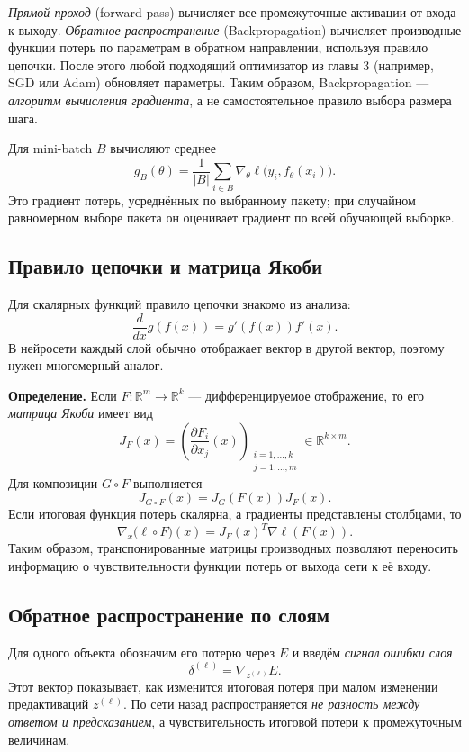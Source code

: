 \documentclass[12pt,a4paper]{article}
\newcommand{\R}{\mathbb{R}}
\begin{document}
\emph{Прямой проход} (forward pass) вычисляет все промежуточные
активации от входа к выходу. \emph{Обратное распространение}
(Backpropagation) вычисляет производные функции потерь
по параметрам в обратном направлении, используя правило цепочки.
После этого любой подходящий оптимизатор из главы 3
(например, SGD или Adam) обновляет параметры.
Таким образом, Backpropagation --- \emph{алгоритм вычисления
градиента}, а не самостоятельное правило выбора размера шага.

Для mini-batch $B$ вычисляют среднее
\[
    g_B(\theta)=\frac1{|B|}\sum_{i\in B}
      \nabla_\theta\ell\bigl(y_i,f_\theta(x_i)\bigr).
\]
Это градиент потерь, усреднённых по выбранному пакету;
при случайном равномерном выборе пакета он оценивает
градиент по всей обучающей выборке.

\subsection{Правило цепочки и матрица Якоби}

Для скалярных функций правило цепочки знакомо из анализа:
\[
    \frac{d}{dx}g(f(x))=g'(f(x))f'(x).
\]
В нейросети каждый слой обычно отображает вектор
в другой вектор, поэтому нужен многомерный аналог.

\textbf{Определение.} Если $F:\R^m\to\R^k$ ---
дифференцируемое отображение, то его
\emph{матрица Якоби} имеет вид
\[
    J_F(x)=\left(\frac{\partial F_i}{\partial x_j}(x)
         \right)_{\substack{i=1,\ldots,k\\j=1,\ldots,m}}
         \in\R^{k\times m}.
\]
Для композиции $G\circ F$ выполняется
\begin{equation}
    J_{G\circ F}(x)=J_G(F(x))J_F(x).
    \label{eq:jacobian-chain}
\end{equation}
Если итоговая функция потерь скалярна, а градиенты
представлены столбцами, то
\[
    \nabla_x\bigl(\ell\circ F\bigr)(x)
      =J_F(x)^T\nabla\ell(F(x)).
\]
Таким образом, транспонированные матрицы производных
позволяют переносить информацию о чувствительности
функции потерь от выхода сети к её входу.

\subsection{Обратное распространение по слоям}

Для одного объекта обозначим его потерю через $E$ и введём
\emph{сигнал ошибки слоя}
\begin{equation}
    \delta^{(\ell)}
       =\nabla_{z^{(\ell)}}E.
    \label{eq:delta}
\end{equation}
Этот вектор показывает, как изменится итоговая потеря
при малом изменении предактиваций $z^{(\ell)}$.
По сети назад распространяется \emph{не разность между ответом
и предсказанием}, а чувствительность итоговой потери
к промежуточным величинам.
\end{document}
